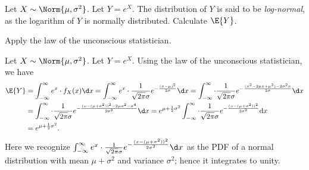 	\begin{exercise}
		Let $X \sim \Norm{\mu, \sigma^2}$. Let $Y = e^X$. The distribution of $Y$ is said to be \emph{log-normal}, as the logarithm of $Y$ is normally distributed. Calculate $\E{Y}$.
		\begin{hint}
			Apply the law of the unconscious statistician.
		\end{hint}
		\begin{solution}
			Let $X \sim \Norm{\mu, \sigma^2}$. Let $Y = e^X$. Using the law of the unconscious statistician, we have
			\begin{align*}
				\E{Y} & = \int_{-\infty}^{\infty} e^x \cdot f_X(x) \d x = \int_{-\infty}^{\infty} e^x \cdot \frac{1}{\sqrt{2 \pi} \sigma} e^{- \frac{(x - \mu)^2}{2 \sigma}} \d x = \int_{-\infty}^{\infty} \cdot \frac{1}{\sqrt{2 \pi} \sigma} e^{- \frac{(x^2 - 2 \mu x + \mu^2) - 2 \sigma^2 x}{2 \sigma}} \d x \\
				& = \int_{-\infty}^{\infty} \cdot \frac{1}{\sqrt{2 \pi} \sigma} e^{- \frac{(x - (\mu + \sigma^2))^2 - 2 \mu \sigma^2 - \sigma^4}{2 \sigma^2}} \d x = e^{\mu + \frac{1}{2} \sigma^2} \int_{-\infty}^{\infty} \cdot \frac{1}{\sqrt{2 \pi} \sigma} e^{- \frac{(x - (\mu + \sigma^2))^2}{2 \sigma^2}} \mathrm{d}x \\
				& = e^{\mu + \frac{1}{2} \sigma^2}.
			\end{align*}
			Here we recognize $\int_{-\infty}^{\infty} e^x \cdot \frac{1}{\sqrt{2 \pi} \sigma} e^{- \frac{(x - (\mu + \sigma^2))^2}{2 \sigma^2}} \d x$ as the PDF of a normal distribution with mean $\mu+\sigma^2$ and variance $\sigma^2$; hence it integrates to unity.
		\end{solution}
	\end{exercise}
	
